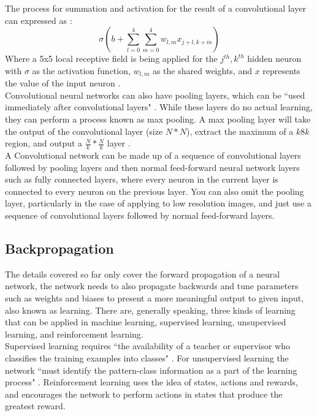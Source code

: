 \documentclass[10pt]{article}
\begin{document}
		The process for summation and activation for the result of a convolutional layer can expressed as \cite{nndl}:
		\begin{equation}
			\sigma (b + \sum^4_{l=0} \sum^4_{m=0} w_{l, m} x_{j+l, k+m})
		\end{equation}
		Where a 5x5 local receptive field is being applied for the $j^{th}, k^{th}$ hidden neuron with $\sigma$ as the activation function, $w_{l, m}$ as the shared weights, and $x$ represents the value of the input neuron \cite{nndl}.\\
		
		Convolutional neural networks can also have pooling layers, which can be ``used immediately after convolutional layers" \cite{nndl}. While these layers do no actual learning, they can perform a process known as max pooling. A max pooling layer will take the output of the convolutional layer (size $N*N$), extract the maximum of a $k8k$ region, and output a $\frac{N}{k} * \frac{N}{k}$ layer \cite{convNN}.\\
		
		A Convolutional network can be made up of a sequence of convolutional layers followed by pooling layers and then normal feed-forward neural network layers such as fully connected layers, where every neuron in the current layer is connected to every neuron on the previous layer. You can also omit the pooling layer, particularly in the case of applying to low resolution images, and just use a sequence of convolutional layers followed by normal feed-forward layers.\\
		
		\medskip
		
		\subsection{Backpropagation}
		
		The details covered so far only cover the forward propagation of a neural network, the network needs to also propagate backwards and tune parameters such as weights and biases to present a more meaningful output to given input, also known as learning. There are, generally speaking, three kinds of learning that can be applied in machine learning, supervised learning, unsupervised learning, and reinforcement learning.\\
		 Supervised learning requires ``the availability of a teacher or supervisor who classifies the training examples into classes" \cite{nnintell}. For unsupervised learning the network ``must identify the pattern-class information as a part of the learning process" \cite{nnintell}. Reinforcement learning uses the idea of states, actions and rewards, and encourages the network to perform actions in states that produce the greatest reward.\\
		 
\end{document}
